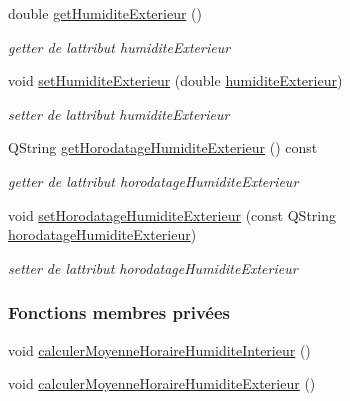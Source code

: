 \begin{DoxyCompactItemize}
double \hyperlink{class_infos_humidite_a23e537fdfa33336a3970838f445387ce}{get\+Humidite\+Exterieur} ()
\begin{DoxyCompactList}\small\item\em getter de l\textquotesingle{}attribut humidite\+Exterieur \end{DoxyCompactList}\item 
void \hyperlink{class_infos_humidite_a8228ff1f1d0466df228ed3f2e2d269ac}{set\+Humidite\+Exterieur} (double \hyperlink{class_infos_humidite_a503a9c849508928d3046292f17f37230}{humidite\+Exterieur})
\begin{DoxyCompactList}\small\item\em setter de l\textquotesingle{}attribut humidite\+Exterieur \end{DoxyCompactList}\item 
Q\+String \hyperlink{class_infos_humidite_a04abb2841492704e125874464052bb4f}{get\+Horodatage\+Humidite\+Exterieur} () const
\begin{DoxyCompactList}\small\item\em getter de l\textquotesingle{}attribut horodatage\+Humidite\+Exterieur \end{DoxyCompactList}\item 
void \hyperlink{class_infos_humidite_acc6231789bd923840dadf4f17310ce69}{set\+Horodatage\+Humidite\+Exterieur} (const Q\+String \hyperlink{class_infos_humidite_aa08b4f342e83f8ad437a8272698bb512}{horodatage\+Humidite\+Exterieur})
\begin{DoxyCompactList}\small\item\em setter de l\textquotesingle{}attribut horodatage\+Humidite\+Exterieur \end{DoxyCompactList}\end{DoxyCompactItemize}
\subsubsection*{Fonctions membres privées}
\begin{DoxyCompactItemize}
\item 
void \hyperlink{class_infos_humidite_acd903311f6c949f8f010b330f517e4f3}{calculer\+Moyenne\+Horaire\+Humidite\+Interieur} ()
\item 
void \hyperlink{class_infos_humidite_afc4f6ba3cd4664118ef40f4c12b76506}{calculer\+Moyenne\+Horaire\+Humidite\+Exterieur} ()
\end{DoxyCompactItemize}
